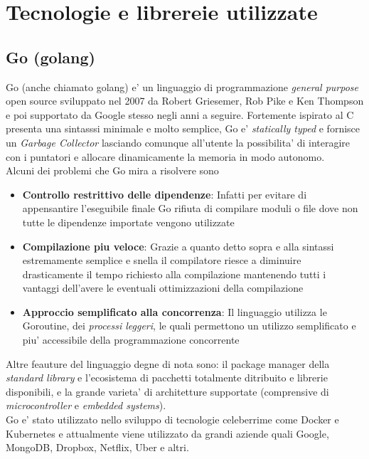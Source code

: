 \chapter{Tecnologie e librereie utilizzate}
\section{Go (golang)}
Go\cite{Go_Wikipedia} (anche chiamato {golang}) e' un linguaggio di programmazione \emph{general purpose} open source sviluppato nel 2007 da Robert Griesemer, Rob Pike e Ken Thompson e poi supportato da Google stesso negli anni a seguire. Fortemente ispirato al C presenta una sintasssi minimale e molto semplice, Go e' \emph{statically typed} e fornisce un \emph{Garbage Collector} lasciando comunque all'utente la possibilita' di interagire con i puntatori e allocare dinamicamente la memoria in modo autonomo.\\
Alcuni dei problemi che Go mira a risolvere sono
\begin{itemize}
    \item \textbf{Controllo restrittivo delle dipendenze}: Infatti per evitare di appensantire l'eseguibile finale Go rifiuta di compilare moduli o file dove non tutte le dipendenze importate vengono utilizzate
    \item \textbf{Compilazione piu veloce}: Grazie a quanto detto sopra e alla sintassi estremamente semplice e snella il compilatore riesce a diminuire drasticamente il tempo richiesto alla compilazione mantenendo tutti i vantaggi dell'avere le eventuali ottimizzazioni della compilazione
    \item \textbf{Approccio semplificato alla concorrenza}: Il linguaggio utilizza le Goroutine, dei \emph{processi leggeri}, le quali permettono un utilizzo semplificato e piu' accessibile della programmazione concorrente
\end{itemize}
Altre feauture del linguaggio degne di nota sono: il package manager della \emph{standard library} e l'ecosistema di pacchetti totalmente ditribuito e librerie disponibili, e la grande varieta' di architetture supportate (comprensive di \emph{microcontroller} e \emph{embedded systems}).\\
Go e' stato utilizzato nello sviluppo di tecnologie celeberrime come Docker e Kubernetes e attualmente viene utilizzato da grandi aziende quali Google, MongoDB, Dropbox, Netflix, Uber e altri.

